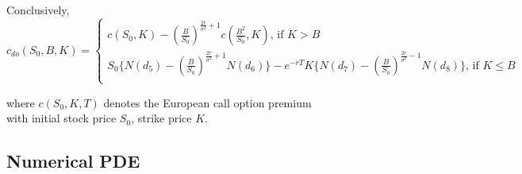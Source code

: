 Conclusively, 
\begin{equation*}
c_{do}(S_{0}, B, K) = 
\begin{cases}
c(S_{0}, K) - {(\frac{B}{S_{0}})}^{\frac{2r}{\sigma^{2}}+1} c(\frac{B^{2}}{S_{0}}, K) \text{, if }K > B\\
S_{0}\{ N(d_{5}) - {(\frac{B}{S_{0}})}^{\frac{2r}{\sigma^{2}}+1} N(d_{6})\} - e^{-rT}K\{ N(d_{7}) - {(\frac{B}{S_{0}})}^{\frac{2r}{\sigma^{2}}-1} N(d_{8})\} \text{, if }K \le B\\
\end{cases}
\end{equation*}
\begin{center}
where $c(S_{0}, K, T)$ denotes the European call option premium\\ with initial stock price $S_{0}$, strike price $K$.
\end{center}
\newpage
\subsection{Numerical PDE}
\newpage
